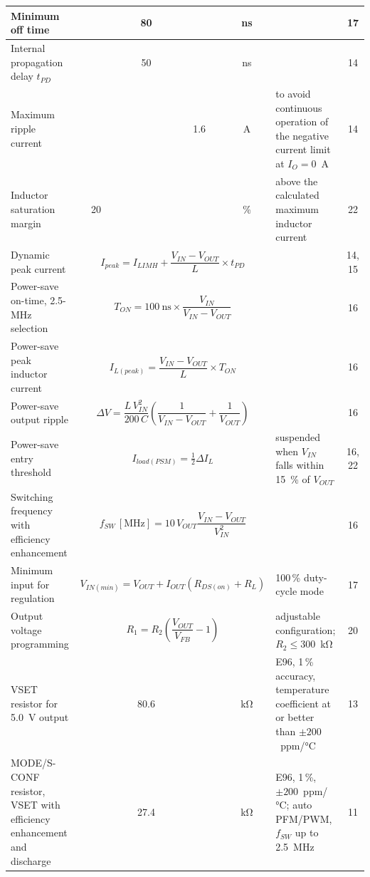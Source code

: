 {\begin{longtable}{|L{4.4cm}|c|c|c|c|L{3.6cm}|c|}
\hline
Minimum off time & & \num{80} & & \si{\nano\second} & & 17 \\
\hline
Internal propagation delay \(t_{PD}\) & & \num{50} & & \si{\nano\second} & & 14 \\
\hline
Maximum ripple current & & & \num{1.6} & \si{\ampere} & to avoid continuous operation of the negative current limit at \(I_O=0\)~A & 14 \\
\hline
Inductor saturation margin & \num{20} & & & \% & above the calculated maximum inductor current & 22 \\
\hline
Dynamic peak current &  & & 14, 15 \\
\hline
Power-save on-time, 2.5-MHz selection &  & & 16 \\
\hline
Power-save peak inductor current &  & & 16 \\
\hline
Power-save output ripple &  & & 16 \\
\hline
Power-save entry threshold &  & suspended when \(V_{IN}\) falls within \SI{15}{\percent} of \(V_{OUT}\) & 16, 22 \\
\hline
Switching frequency with efficiency enhancement &  & & 16 \\
\hline
Minimum input for regulation &  & 100\,\% duty-cycle mode & 17 \\
\hline
Output voltage programming &  & adjustable configuration; \(R_2\leq300\)~\si{\kilo\ohm} & 20 \\
\hline
VSET resistor for \SI{5.0}{\volt} output & & \num{80.6} & & \si{\kilo\ohm} & E96, 1\,\% accuracy, temperature coefficient at or better than $\pm200$~ppm/\si{\celsius} & 13 \\
\hline
MODE/S-CONF resistor, VSET with efficiency enhancement and discharge & & \num{27.4} & & \si{\kilo\ohm} & E96, 1\,\%, $\pm200$~ppm/\si{\celsius}; auto PFM/PWM, \(f_{SW}\) up to \SI{2.5}{\mega\hertz} & 11 \\

\end{longtable}}
